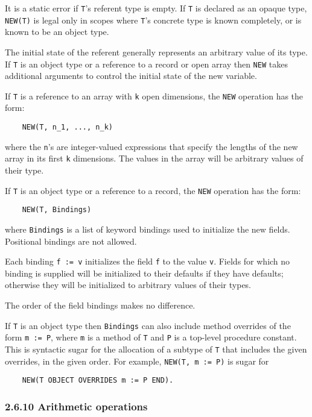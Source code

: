 \documentclass[10pt]{article}
\begin{document}
It is a static error if \verb|T|'s referent type is empty.  If \verb|T| is
declared as an opaque type, \verb|NEW(T)| is legal only in scopes where
\verb|T|'s concrete type is known completely, or is known to be an object
type.

The initial state of the referent generally represents an arbitrary value of
its type.  If \verb|T| is an object type or a reference to a record or open
array then \verb|NEW| takes additional arguments to control the initial state
of the new variable.

If \verb|T| is a reference to an array with \verb|k| open dimensions, the
\verb|NEW| operation has the form:
\begin{verbatim}
    NEW(T, n_1, ..., n_k)
\end{verbatim}
where the \verb|n|'s are integer-valued expressions that specify the lengths
of the new array in its first \verb|k| dimensions.  The values in the array
will be arbitrary values of their type.

If \verb|T| is an object type or a reference to a record, the \verb|NEW|
operation has the form:
\begin{verbatim}
    NEW(T, Bindings)
\end{verbatim}
where \verb|Bindings| is a list of keyword bindings used to initialize the new
fields.  Positional bindings are not allowed.

Each binding \verb|f := v| initializes the field \verb|f| to the value
\verb|v|.  Fields for which no binding is supplied will be initialized to
their defaults if they have defaults; otherwise they will be initialized to
arbitrary values of their types.

The order of the field bindings makes no difference.

If \verb|T| is an object type then \verb|Bindings| can also include method
overrides of the form \verb|m := P|, where \verb|m| is a method of \verb|T|
and \verb|P| is a top-level procedure constant.  This is syntactic sugar for
the allocation of a subtype of \verb|T| that includes the given overrides, in
the given order.  For example, \verb|NEW(T, m := P)| is sugar for
\begin{verbatim}
    NEW(T OBJECT OVERRIDES m := P END).
\end{verbatim}

\subsubsection*{2.6.10 Arithmetic operations}
\end{document}
